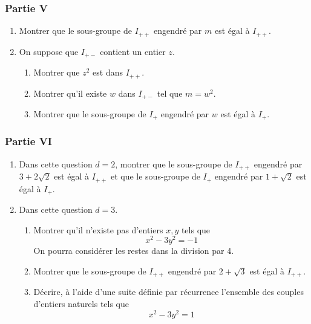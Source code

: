\subsubsection*{Partie V}
\begin{enumerate}
\item Montrer que le sous-groupe de $I_{++}$ engendré par $m$ est égal à $I_{++}$.
\item On suppose que $I_{+-}$ contient un entier $z$.
\begin{enumerate}
\item Montrer que $z^2$ est dans $I_{++}$.
\item Montrer qu'il existe $w$ dans $I_{+-}$ tel que $m=w^2$.
\item Montrer que le sous-groupe de $I_{+}$ engendré par $w$ est égal à $I_{+}$.
\end{enumerate}
\end{enumerate}

\subsubsection*{Partie VI}
\begin{enumerate}
\item Dans cette question $d=2$, montrer que le sous-groupe de $I_{++}$ engendré par $3+2 \sqrt 2$ est égal à $I_{++}$ et que le sous-groupe de $I_{+}$ engendré par $1+\sqrt 2 $ est égal à $I_{+}$.
\item Dans cette question $d=3$.
\begin{enumerate}
\item Montrer qu'il n'existe pas d'entiers $x,y$ tels que
$$x^2- 3y^2=-1$$
On pourra considérer les restes dans la division par 4.
\item Montrer que le sous-groupe de $I_{++}$ engendré par $2+\sqrt 3$ est égal à $I_{++}$.
\item Décrire, à l'aide d'une suite définie par récurrence l'ensemble des couples d'entiers naturels tels que
$$x^2-3y^2=1$$
\end{enumerate}
\end{enumerate}
